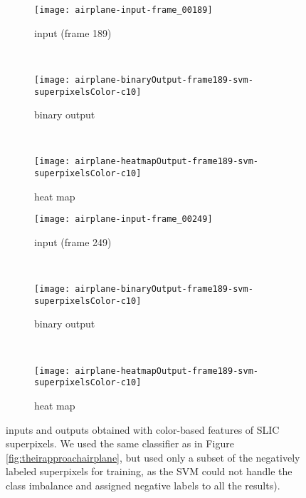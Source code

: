 \begin{figure}[ht]
	\centering
	\begin{subfigure}[h]{0.31\textwidth}
		\texttt{[image: airplane-input-frame\_00189]}
		\caption*{input (frame 189)}
	\end{subfigure}
	~
	\begin{subfigure}[h]{0.31\textwidth}
		\texttt{[image: airplane-binaryOutput-frame189-svm-superpixelsColor-c10]}	
		\caption*{binary output}
	\end{subfigure}
	~
	\begin{subfigure}[h]{0.31\textwidth}
		\texttt{[image: airplane-heatmapOutput-frame189-svm-superpixelsColor-c10]}	
		\caption*{heat map}
	\end{subfigure}
	
	\vspace{3mm}
	\begin{subfigure}[h]{0.31\textwidth}
		\texttt{[image: airplane-input-frame\_00249]}	
		\caption*{input (frame 249)}
	\end{subfigure}
	~
	\begin{subfigure}[h]{0.31\textwidth}
		\texttt{[image: airplane-binaryOutput-frame189-svm-superpixelsColor-c10]}	
		\caption*{binary output}
	\end{subfigure}	
	~
	\begin{subfigure}[h]{0.31\textwidth}
		\texttt{[image: airplane-heatmapOutput-frame189-svm-superpixelsColor-c10]}	
		\caption*{heat map}
	\end{subfigure}	
	\caption{inputs and outputs obtained with color-based features of SLIC superpixels. We used the same classifier as in Figure \ref{fig:theirapproachairplane}, but used only a subset of the negatively labeled superpixels for training, as the SVM could not handle the class imbalance and assigned negative labels to all the results).}
	\label{fig:airplaneSLIC}
\end{figure}

